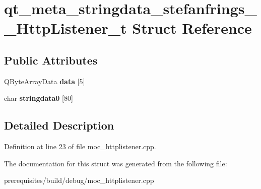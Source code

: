 \hypertarget{structqt__meta__stringdata__stefanfrings_____http_listener__t}{}\section{qt\+\_\+meta\+\_\+stringdata\+\_\+stefanfrings\+\_\+\+\_\+\+Http\+Listener\+\_\+t Struct Reference}
\label{structqt__meta__stringdata__stefanfrings_____http_listener__t}
\subsection*{Public Attributes}
\begin{DoxyCompactItemize}
\item 
\mbox{\label{structqt__meta__stringdata__stefanfrings_____http_listener__t_aae2f593789ed8ff42a76c4bee2b5a20e}} 
Q\+Byte\+Array\+Data {\bfseries data} \mbox{[}5\mbox{]}
\item 
\mbox{\label{structqt__meta__stringdata__stefanfrings_____http_listener__t_a3010f3b2faa11b6778da579643163c80}} 
char {\bfseries stringdata0} \mbox{[}80\mbox{]}
\end{DoxyCompactItemize}


\subsection{Detailed Description}


Definition at line 23 of file moc\+\_\+httplistener.\+cpp.



The documentation for this struct was generated from the following file\+:\begin{DoxyCompactItemize}
\item 
prerequisites/build/debug/moc\+\_\+httplistener.\+cpp\end{DoxyCompactItemize}
